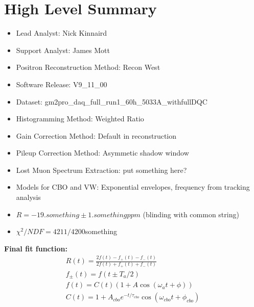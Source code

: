 \chapter*{High Level Summary}

\begin{itemize}
	\item{Lead Analyst: Nick Kinnaird}
	\item{Support Analyst: James Mott}
	\item{Positron Reconstruction Method: Recon West}
	\item{Software Release: V9\_11\_00}
	\item{Dataset: gm2pro\_daq\_full\_run1\_60h\_5033A\_withfullDQC}
	\item{Histogramming Method: Weighted Ratio}
	\item{Gain Correction Method: Default in reconstruction}
	\item{Pileup Correction Method: Asymmetic shadow window}
	\item{Lost Muon Spectrum Extraction: put something here?}
	\item{Models for CBO and VW: Exponential envelopes, frequency from tracking analysis}
	\item{$R = -19.something \pm 1.something ppm$ (blinding with common string)}
	\item{$\chi^{2}/NDF = 4211/4200$something}
\end{itemize}

\textbf{Final fit function:}
\begin{gather*}
		R(t) = \frac{2f(t) - f_{+}(t) - f_{-}(t)}{2f(t) + f_{+}(t) + f_{-}(t)} \\
		f_{\pm}(t) = f(t \pm T_{a}/2) \\
		f(t) = C(t) (1 + A \cos(\omega_{a}t + \phi)) \\ 
		C(t) = 1 + A_{cbo} e^{-t/\tau_{cbo}} \cos(\omega_{cbo}t + \phi_{cbo})
\end{gather*}
